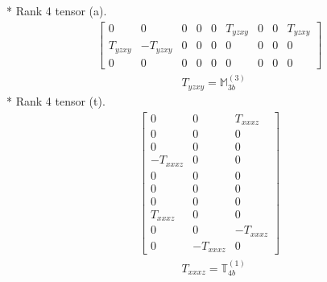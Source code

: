 \documentclass[fleqn,8pt,landscape]{jsarticle}
\begin{document}
* Rank 4 tensor (a).
\begin{align*}
\begin{bmatrix} 0 & 0 & 0 & 0 & 0 & T_{yzxy} & 0 & 0 & T_{yzxy} \\ T_{yzxy} & - T_{yzxy} & 0 & 0 & 0 & 0 & 0 & 0 & 0 \\ 0 & 0 & 0 & 0 & 0 & 0 & 0 & 0 & 0 \end{bmatrix}
\end{align*}
\begin{align*}
& T_{yzxy} = \mathbb{M}_{3b}^{(3)}
\end{align*}
* Rank 4 tensor (t).
\begin{align*}
\begin{bmatrix} 0 & 0 & T_{xxxz} \\ 0 & 0 & 0 \\ 0 & 0 & 0 \\ - T_{xxxz} & 0 & 0 \\ 0 & 0 & 0 \\ 0 & 0 & 0 \\ 0 & 0 & 0 \\ T_{xxxz} & 0 & 0 \\ 0 & 0 & - T_{xxxz} \\ 0 & - T_{xxxz} & 0 \end{bmatrix}
\end{align*}
\begin{align*}
& T_{xxxz} = \mathbb{T}_{4b}^{(1)}
\end{align*}
\end{document}
